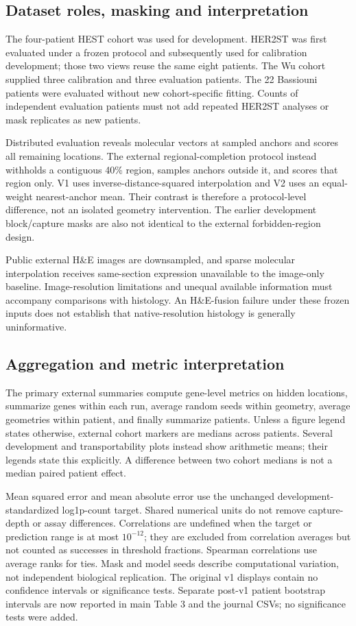 \subsection{Dataset roles, masking and interpretation}
The four-patient HEST cohort was used for development. HER2ST was first evaluated under a frozen protocol and subsequently used for calibration development; those two views reuse the same eight patients. The Wu cohort supplied three calibration and three evaluation patients. The 22 Bassiouni patients were evaluated without new cohort-specific fitting. Counts of independent evaluation patients must not add repeated HER2ST analyses or mask replicates as new patients.

Distributed evaluation reveals molecular vectors at sampled anchors and scores all remaining locations. The external regional-completion protocol instead withholds a contiguous 40\% region, samples anchors outside it, and scores that region only. V1 uses inverse-distance-squared interpolation and V2 uses an equal-weight nearest-anchor mean. Their contrast is therefore a protocol-level difference, not an isolated geometry intervention. The earlier development block/capture masks are also not identical to the external forbidden-region design.

Public external H\&E images are downsampled, and sparse molecular interpolation receives same-section expression unavailable to the image-only baseline. Image-resolution limitations and unequal available information must accompany comparisons with histology. An H\&E-fusion failure under these frozen inputs does not establish that native-resolution histology is generally uninformative.

\subsection{Aggregation and metric interpretation}
The primary external summaries compute gene-level metrics on hidden locations, summarize genes within each run, average random seeds within geometry, average geometries within patient, and finally summarize patients. Unless a figure legend states otherwise, external cohort markers are medians across patients. Several development and transportability plots instead show arithmetic means; their legends state this explicitly. A difference between two cohort medians is not a median paired patient effect.

Mean squared error and mean absolute error use the unchanged development-standardized log1p-count target. Shared numerical units do not remove capture-depth or assay differences. Correlations are undefined when the target or prediction range is at most $10^{-12}$; they are excluded from correlation averages but not counted as successes in threshold fractions. Spearman correlations use average ranks for ties. Mask and model seeds describe computational variation, not independent biological replication. The original v1 displays contain no confidence intervals or significance tests. Separate post-v1 patient bootstrap intervals are now reported in main Table 3 and the journal CSVs; no significance tests were added.
\clearpage
